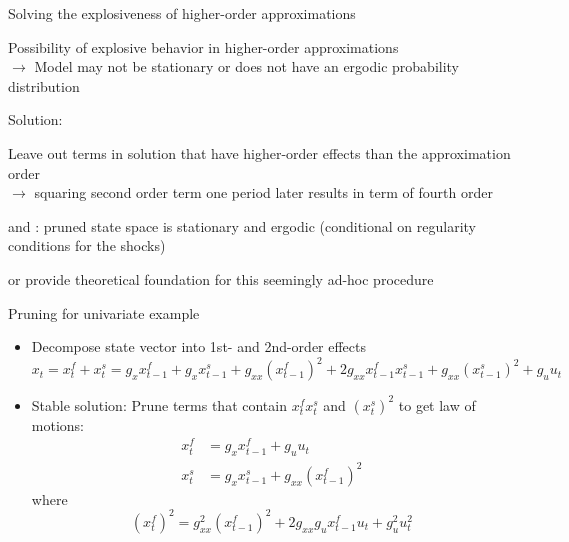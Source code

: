 \begin{frame}{Solving the explosiveness of higher-order approximations}
  \begin{witemize}
    \item Possibility of explosive behavior in higher-order approximations\\
    $\rightarrow$ Model may not be stationary or does not have an ergodic probability distribution
    \item Solution: 
    \begin{witemize}
      \item Leave out terms in solution that have higher-order effects than the approximation order\\
      $\rightarrow$ squaring second order term one period later results in term of fourth order
      \item \textcite{KKSS2008} and \textcite{AndreasenEtal2018}: pruned state space is stationary and ergodic (conditional on regularity conditions for the shocks)
      \item \textcite{LombardoUhlig2018} or \textcite{LanMeyerGohde2013pruning} provide theoretical foundation for this seemingly ad-hoc procedure
    \end{witemize}

  \end{witemize}
\end{frame}



\begin{frame}{Pruning for univariate example}

  \begin{itemize}
    \item Decompose state vector into 1st- and 2nd-order effects
          \begin{equation}
            x_t = x_t^f + x_t^s = g_{x}x_{t-1}^f  + g_{x}x_{t-1}^s + g_{xx}(x_{t-1}^f)^2 + 2g_{xx}x_{t-1}^f x_{t-1}^s + g_{xx}(x_{t-1}^s)^2 + g_{u}u_t
          \end{equation}

    \item Stable solution: Prune terms that contain $x_t^f x_t^s$ and $(x_t^s)^2$ to get law of motions:
          \begin{align}
            x_t^f & = g_{x}x_{t-1}^f + g_{u}u_t            \\
            x_t^s & = g_{x}x_{t-1}^s + g_{xx}(x_{t-1}^f)^2
          \end{align}
          where
          \begin{equation}
            \left(x_t^f\right)^2 = g_{xx}^2 \left(x_{t-1}^f\right)^2 + 2g_{xx}g_{u}x_{t-1}^f u_t + g_{u}^2 u_t^2
          \end{equation}
  \end{itemize}
\end{frame}



